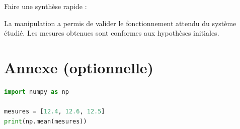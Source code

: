 \documentclass[11pt,a4paper]{article}
\begin{document}
Faire une synthèse rapide :

La manipulation a permis de valider le fonctionnement attendu du système étudié. Les mesures obtenues sont conformes aux hypothèses initiales.

\section*{Annexe (optionnelle)}

\begin{lstlisting}[language=Python,caption=Script de traitement]
import numpy as np

mesures = [12.4, 12.6, 12.5]
print(np.mean(mesures))
\end{lstlisting}
\end{document}
